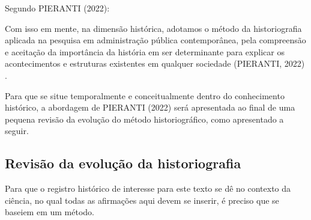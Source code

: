 \documentclass[
12pt,		%
openright,	%
twoside,  %
a4paper,			%
chapter=TITLE,		%
english,			%
french,				%
spanish,			%
brazil				%
]{USPSC-classe/USPSC_RedarTex}
\begin{document}
Segundo PIERANTI (2022):











\noindent\begin{center}\mbox{\centering{}}\end{center}













Com isso em mente, na dimens\~ao hist\'orica, adotamos o m\'etodo da historiografia aplicada na pesquisa em administra\c{c}\~ao p\'ublica contempor\^anea, pela compreens\~ao e aceita\c{c}\~ao da import\^ancia da hist\'oria em ser determinante para explicar os acontecimentos e estruturas existentes em qualquer sociedade (PIERANTI, 2022) .










Para que se situe temporalmente e conceitualmente dentro do conhecimento hist\'orico, a abordagem de  PIERANTI (2022) ser\'a apresentada ao final de uma pequena revis\~ao da evolu\c{c}\~ao do m\'etodo historiogr\'afico, como apresentado a seguir.










\subsection[Revis\~ao da evolu\c{c}\~ao da historiografia]{Revis\~ao da evolu\c{c}\~ao da historiografia}\label{Revis\~ao da evolu\c{c}\~ao da historiografia}
Para que o registro hist\'orico de interesse para este texto se d\^e no contexto da ci\^encia, no qual todas as afirma\c{c}\~oes aqui devem se inserir, \'e preciso que se baseiem em um m\'etodo.
\end{document}
